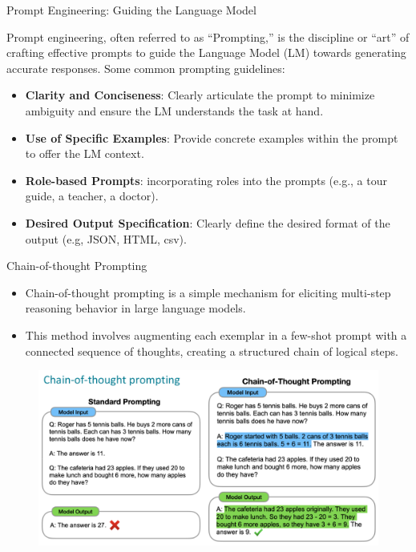 \documentclass[handout]{beamer}
\begin{document}
\begin{frame}{Prompt Engineering: Guiding the Language Model}
\begin{scriptsize}
Prompt engineering, often referred to as ``Prompting,'' is the discipline or ``art'' of crafting effective prompts to guide the Language Model (LM) towards generating accurate responses. Some common prompting guidelines: \vspace{0.5cm}

\begin{itemize}
\item \textbf{Clarity and Conciseness}: Clearly articulate the prompt to minimize ambiguity and ensure the LM understands the task at hand.
\item \textbf{Use of Specific Examples}: Provide concrete examples within the prompt to offer the LM context.
\item \textbf{Role-based Prompts}: incorporating roles into the prompts (e.g., a tour guide, a teacher, a doctor).
\item \textbf{Desired Output Specification}: Clearly define the desired format of the output (e.g, JSON, HTML, csv). 
\end{itemize}
\end{scriptsize}
\end{frame}


\begin{frame}{Chain-of-thought Prompting}

\begin{scriptsize}
\begin{itemize}
\item Chain-of-thought prompting is a simple mechanism for eliciting multi-step reasoning behavior in large language models.
\item  This method involves augmenting each exemplar in a few-shot prompt with a connected sequence of thoughts, creating a structured chain of logical steps. \cite{wei2022chain}
\end{itemize}
\end{scriptsize}



 \begin{figure}[h]
        	\includegraphics[scale = 0.3]{pics/chainoftought.png}
        \end{figure}



\end{frame}
\end{document}

